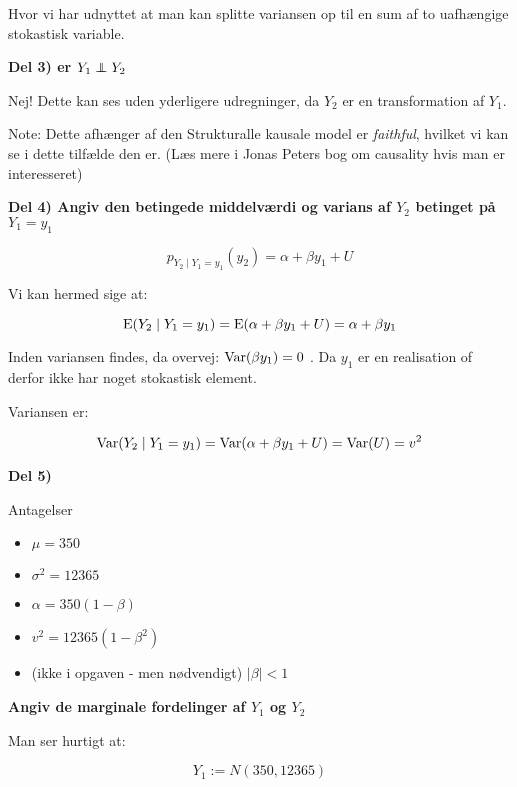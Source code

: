 Hvor vi har udnyttet at man kan splitte variansen op til en sum af to uafhængige stokastisk variable.

\textbf{Del 3) er $Y_1 \independent Y_2$}

Nej! Dette kan ses uden yderligere udregninger, da $Y_2$ er en transformation af $Y_1$. 

Note: Dette afhænger af den Strukturalle kausale model er \textit{faithful}, hvilket vi kan se i dette tilfælde den er. (Læs mere i Jonas Peters bog om causality hvis man er interesseret)

\textbf{Del 4) Angiv den betingede middelværdi og varians af $Y_2$ betinget på $Y_1= y_1$}

\begin{equation}
    p_{Y_2\mid Y_1 = y_1}(y_2) = \alpha + \beta y_1 + U
\end{equation}

Vi kan hermed sige at:

\begin{equation}
    \text{E}(Y_2 \mid Y_1 = y_1) = \text{E}(\alpha + \beta y_1 + U) = \alpha + \beta y_1
\end{equation}

Inden variansen findes, da overvej: $\text{Var}(\beta y_1) = 0$ . Da $y_1 $ er en realisation of derfor ikke har noget stokastisk element.  

Variansen er:

\begin{equation}
    \text{Var}(Y_2 \mid Y_1 = y_1) = \text{Var}(\alpha + \beta y_1 + U) = \text{Var}(U) = v^2
\end{equation}

\textbf{Del 5)}

Antagelser
\begin{itemize}
    \item $\mu =350$
    \item $\sigma^2 = 12365$
    \item $\alpha = 350(1- \beta)$
    \item $v^2 =  12365(1 - \beta^2)$
    \item (ikke i opgaven - men nødvendigt) $\lvert \beta \rvert < 1$
\end{itemize}

\textbf{Angiv de marginale fordelinger af $Y_1$ og $Y_2$}

Man ser hurtigt at:

\begin{equation}
    Y_1 := N(350, 12365)    
\end{equation}

